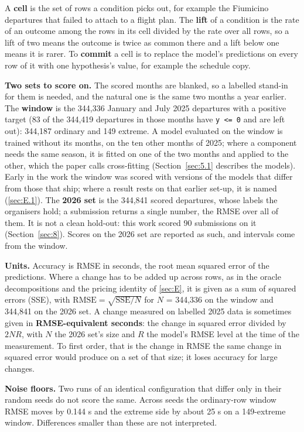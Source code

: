 \documentclass[
  manuscript=article,
  layout=preprint,
  year=2026,
  volume=x,
]{extra/joas}
\begin{document}
A \textbf{cell} is the set of rows a condition picks out, for example the Fiumicino departures that failed to attach to a flight plan. The \textbf{lift} of a condition is the rate of an outcome among the rows in its cell divided by the rate over all rows, so a lift of two means the outcome is twice as common there and a lift below one means it is rarer. To \textbf{commit} a cell is to replace the model's predictions on every row of it with one hypothesis's value, for example the schedule copy.

\textbf{Two sets to score on.} The scored months are blanked, so a labelled stand-in for them is needed, and the natural one is the same two months a year earlier. The \textbf{window} is the 344,336 January and July 2025 departures with a positive target (83 of the 344,419 departures in those months have \texttt{y\ \textless{}=\ 0} and are left out): 344,187 ordinary and 149 extreme. A model evaluated on the window is trained without its months, on the ten other months of 2025; where a component needs the same season, it is fitted on one of the two months and applied to the other, which the paper calls cross-fitting (Section~\ref{sec:5.1} describes the models). Early in the work the window was scored with versions of the models that differ from those that ship; where a result rests on that earlier set-up, it is named (\ref{sec:E.1}). The \textbf{2026 set} is the 344,841 scored departures, whose labels the organisers hold; a submission returns a single number, the RMSE over all of them. It is not a clean hold-out: this work scored 90 submissions on it (Section~\ref{sec:8}). Scores on the 2026 set are reported as such, and intervals come from the window.

\textbf{Units.} Accuracy is RMSE in seconds, the root mean squared error of the predictions. Where a change has to be added up across rows, as in the oracle decompositions and the pricing identity of \ref{sec:E}, it is given as a sum of squared errors (SSE), with $\mathrm{RMSE} = \sqrt{\mathrm{SSE}/N}$ for $N$ = 344,336 on the window and 344,841 on the 2026 set. A change measured on labelled 2025 data is sometimes given in \textbf{RMSE-equivalent seconds}: the change in squared error divided by $2NR$, with $N$ the 2026 set's size and $R$ the model's RMSE level at the time of the measurement. To first order, that is the change in RMSE the same change in squared error would produce on a set of that size; it loses accuracy for large changes.

\textbf{Noise floors.} Two runs of an identical configuration that differ only in their random seeds do not score the same. Across seeds the ordinary-row window RMSE moves by 0.144 s and the extreme side by about 25 s on a 149-extreme window. Differences smaller than these are not interpreted.
\end{document}
